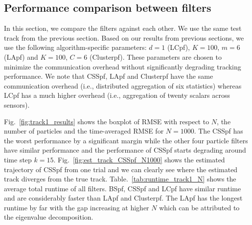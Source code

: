 \documentclass[10pt,letterpaper,final]{article}
\begin{document}

\subsection{Performance comparison between filters}
In this section, we compare the filters against each other. We use the same test track from the previous section. Based on our results from previous sections, we use the following algorithm-specific parameters: $d=1$ (LCpf), $K=100$, $m=6$ (LApf) and $K=100$, $C=6$ (Clusterpf). These parameters are chosen to minimize the communication overhead without significantly degrading tracking performance. We note that CSSpf, LApf and Clusterpf have the same communication overhead (i.e., distributed aggregation of six statistics) whereas LCpf has a much higher overhead (i.e., aggregation of twenty scalars across sensors). 

Fig.~\ref{fig:track1_results} shows the boxplot of RMSE with respect to $N$, the number of particles and the time-averaged RMSE for $N=1000$. The CSSpf has the worst performance by a significant margin while the other four particle filters have similar performance and the performance of CSSpf starts degrading around time step $k=15$. Fig.~\ref{fig:est_track_CSSpf_N1000} shows the estimated trajectory of CSSpf from one trial and we can clearly see where the estimated track diverges from the true track. Table.~\ref{tab:runtime_track1_N} shows the average total runtime of all filters. BSpf, CSSpf and LCpf have similar runtime and are considerably faster than LApf and Clusterpf. The LApf has the longest runtime by far with the gap increasing at higher $N$ which can be attributed to the eigenvalue decomposition. 
\end{document}
